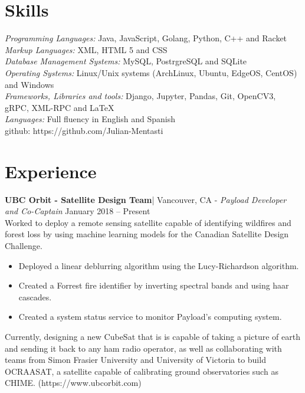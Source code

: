 \documentclass[letter]{res}
\begin{document}
\address{ (778)-882-3453 \\}
\address{
  \texttt{julian@mentasti.net}\\ } 
\begin{resume}
  \noindent\makebox[\linewidth]{\rule{\paperwidth}{0.4pt}}

\section{Skills}
{\sl Programming Languages:}  Java, JavaScript, Golang, Python, C++ and Racket\\
{\sl Markup Languages:} XML, HTML 5 and CSS \\
{\sl Database Management Systems:} MySQL, PostrgreSQL and SQLite \\
{\sl Operating Systems:} Linux/Unix systems (ArchLinux, Ubuntu, EdgeOS, CentOS) and Windows \\ 
{\sl Frameworks, Libraries and tools:} Django, Jupyter, Pandas, Git, OpenCV3, gRPC, XML-RPC and  \LaTeX \\ 
{\sl Languages:} Full fluency in English and Spanish \\
github: https://github.com/Julian-Mentasti
 \vspace{-4mm}

\section{Experience}
\textbf{UBC Orbit - Satellite Design Team}| Vancouver, CA\newline 
 - {\sl Payload Developer and Co-Captain} \hfill January 2018 – Present\\
 Worked to deploy a remote sensing satellite capable of identifying wildfires and forest loss by using machine learning models for the Canadian Satellite Design Challenge.\\
 \vspace{-2mm}
 \begin{itemize}
 \item Deployed a linear deblurring algorithm using the Lucy-Richardson algorithm.
 \item Created a Forrest fire identifier by inverting spectral bands and using haar cascades. 
 \item Created a system status service to monitor Payload's computing system. 
 \end{itemize}
 Currently, designing a new CubeSat that is is capable of taking a picture of earth and sending it back to any ham radio operator, as well as collaborating with teams from Simon Frasier University and University of Victoria to build OCRAASAT, a satellite capable of calibrating ground observatories such as CHIME. (https://www.ubcorbit.com)


\end{resume}
\end{document}
